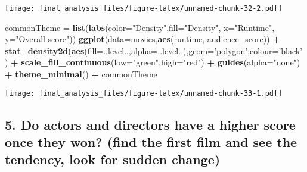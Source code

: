 \documentclass[]{article}
\newenvironment{Shaded}{\begin{snugshade}}{\end{snugshade}}
\newcommand{\KeywordTok}[1]{\textcolor[rgb]{0.13,0.29,0.53}{\textbf{#1}}}
\newcommand{\DataTypeTok}[1]{\textcolor[rgb]{0.13,0.29,0.53}{#1}}
\newcommand{\StringTok}[1]{\textcolor[rgb]{0.31,0.60,0.02}{#1}}
\newcommand{\OperatorTok}[1]{\textcolor[rgb]{0.81,0.36,0.00}{\textbf{#1}}}
\newcommand{\NormalTok}[1]{#1}
\begin{document}
\texttt{[image: final\_analysis\_files/figure-latex/unnamed-chunk-32-2.pdf]}

\begin{Shaded}
\begin{Highlighting}[]
\NormalTok{commonTheme =}\StringTok{ }\KeywordTok{list}\NormalTok{(}\KeywordTok{labs}\NormalTok{(}\DataTypeTok{color=}\StringTok{"Density"}\NormalTok{,}\DataTypeTok{fill=}\StringTok{"Density"}\NormalTok{, }\DataTypeTok{x=}\StringTok{"Runtime"}\NormalTok{, }\DataTypeTok{y=}\StringTok{"Overall score"}\NormalTok{))}
\KeywordTok{ggplot}\NormalTok{(}\DataTypeTok{data=}\NormalTok{movies,}\KeywordTok{aes}\NormalTok{(runtime, audience_score)) }\OperatorTok{+}\StringTok{ }
\StringTok{  }\KeywordTok{stat_density2d}\NormalTok{(}\KeywordTok{aes}\NormalTok{(}\DataTypeTok{fill=}\NormalTok{..level..,}\DataTypeTok{alpha=}\NormalTok{..level..),}\DataTypeTok{geom=}\StringTok{'polygon'}\NormalTok{,}\DataTypeTok{colour=}\StringTok{'black'}\NormalTok{) }\OperatorTok{+}\StringTok{ }
\StringTok{  }\KeywordTok{scale_fill_continuous}\NormalTok{(}\DataTypeTok{low=}\StringTok{"green"}\NormalTok{,}\DataTypeTok{high=}\StringTok{"red"}\NormalTok{) }\OperatorTok{+}
\StringTok{  }\KeywordTok{guides}\NormalTok{(}\DataTypeTok{alpha=}\StringTok{"none"}\NormalTok{) }\OperatorTok{+}\StringTok{ }
\StringTok{  }\KeywordTok{theme_minimal}\NormalTok{() }\OperatorTok{+}
\StringTok{   }\NormalTok{commonTheme}
\end{Highlighting}
\end{Shaded}

\texttt{[image: final\_analysis\_files/figure-latex/unnamed-chunk-33-1.pdf]}

\subsection{5. Do actors and directors have a higher score once they
won? (find the first film and see the tendency, look for sudden
change)}\label{do-actors-and-directors-have-a-higher-score-once-they-won-find-the-first-film-and-see-the-tendency-look-for-sudden-change-1}
\end{document}
